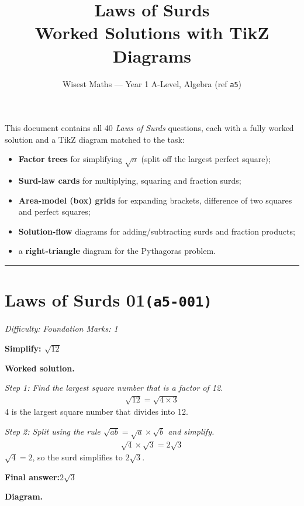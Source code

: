 \documentclass[11pt]{article}
\title{\textbf{Laws of Surds}\\[0.3em]\large Worked Solutions with TikZ Diagrams}
\author{Wisest Maths --- Year 1 A-Level, Algebra (ref \texttt{a5})}
\date{}
\newcommand{\question}[1]{\par\medskip\noindent\textbf{#1}\par}
\begin{document}
\maketitle
\noindent This document contains all 40 \emph{Laws of Surds} questions, each with a fully worked
solution and a TikZ diagram matched to the task:
\begin{itemize}\setlength{\itemsep}{1pt}
  \item \textbf{Factor trees} for simplifying $\sqrt{n}$ (split off the largest perfect square);
  \item \textbf{Surd-law cards} for multiplying, squaring and fraction surds;
  \item \textbf{Area-model (box) grids} for expanding brackets, difference of two squares and perfect squares;
  \item \textbf{Solution-flow} diagrams for adding/subtracting surds and fraction products;
  \item a \textbf{right-triangle} diagram for the Pythagoras problem.
\end{itemize}
\tableofcontents
\bigskip
\hrule

\section*{Laws of Surds 01\quad\small\texttt{(a5-001)}}
\textit{Difficulty: Foundation \quad\textbar\quad Marks: 1}

\question{Simplify: \( \sqrt{12} \)}

\textbf{Worked solution.}

\textit{Step 1: Find the largest square number that is a factor of 12.}
\[\begin{gathered}
\sqrt{12} = \sqrt{4 \times 3}
\end{gathered}\]
4 is the largest square number that divides into 12.

\textit{Step 2: Split using the rule \( \sqrt{ab} = \sqrt{a} \times \sqrt{b} \) and simplify.}
\[\begin{gathered}
\sqrt{4} \times \sqrt{3} = 2\sqrt{3}
\end{gathered}\]
\( \sqrt{4} = 2 \), so the surd simplifies to \( 2\sqrt{3} \).

\begin{answerbox}
\textbf{Final answer:}\quad \(\displaystyle 2\sqrt{3}\)
\end{answerbox}
\textbf{Diagram.}
\end{document}
